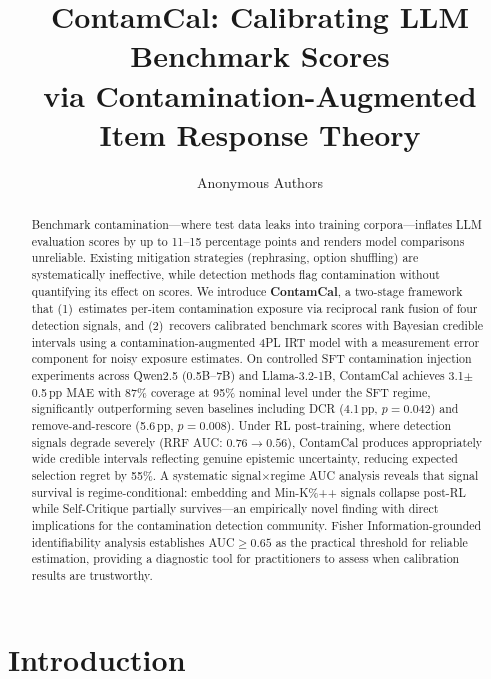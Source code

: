 \documentclass[letterpaper]{article}
\title{ContamCal: Calibrating LLM Benchmark Scores\\via Contamination-Augmented Item Response Theory}
\author{
Anonymous Authors
}
\date{}
\begin{document}
\maketitle

\begin{abstract}
Benchmark contamination---where test data leaks into training corpora---inflates LLM evaluation scores by up to 11--15 percentage points and renders model comparisons unreliable.
Existing mitigation strategies (rephrasing, option shuffling) are systematically ineffective, while detection methods flag contamination without quantifying its effect on scores.
We introduce \textbf{ContamCal}, a two-stage framework that (1)~estimates per-item contamination exposure via reciprocal rank fusion of four detection signals, and (2)~recovers calibrated benchmark scores with Bayesian credible intervals using a contamination-augmented 4PL IRT model with a measurement error component for noisy exposure estimates.
On controlled SFT contamination injection experiments across Qwen2.5 (0.5B--7B) and Llama-3.2-1B, ContamCal achieves 3.1$\pm$0.5\,pp MAE with 87\% coverage at 95\% nominal level under the SFT regime, significantly outperforming seven baselines including DCR (4.1\,pp, $p{=}0.042$) and remove-and-rescore (5.6\,pp, $p{=}0.008$).
Under RL post-training, where detection signals degrade severely (RRF AUC: $0.76 \to 0.56$), ContamCal produces appropriately wide credible intervals reflecting genuine epistemic uncertainty, reducing expected selection regret by 55\%.
A systematic signal$\times$regime AUC analysis reveals that signal survival is regime-conditional: embedding and Min-K\%++ signals collapse post-RL while Self-Critique partially survives---an empirically novel finding with direct implications for the contamination detection community.
Fisher Information-grounded identifiability analysis establishes AUC${\geq}0.65$ as the practical threshold for reliable estimation, providing a diagnostic tool for practitioners to assess when calibration results are trustworthy.
\end{abstract}

\section{Introduction}
\label{sec:intro}
\end{document}
